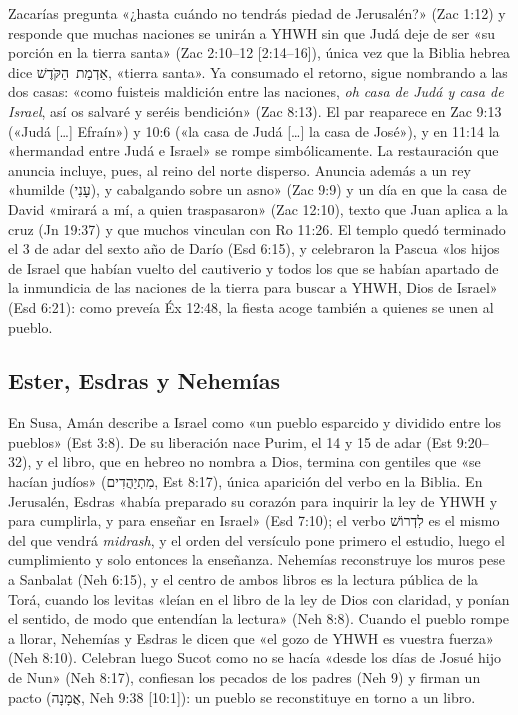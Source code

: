 \documentclass[11pt,letterpaper]{article}
\newcommand{\heb}[1]{\mbox{\foreignlanguage{hebrew}{#1}}}
\begin{document}
Zacarías pregunta «¿hasta cuándo no tendrás piedad de Jerusalén?» (Zac 1:12) y responde que muchas naciones se unirán a YHWH sin que Judá deje de ser «su porción en la tierra santa» (Zac 2:10--12 [2:14--16]), única vez que la Biblia hebrea dice \heb{אַדְמַת הַקֹּדֶשׁ}, «tierra santa». Ya consumado el retorno, sigue nombrando a las dos casas: «como fuisteis maldición entre las naciones, \emph{oh casa de Judá y casa de Israel}, así os salvaré y seréis bendición» (Zac 8:13). El par reaparece en Zac 9:13 («Judá [\ldots] Efraín») y 10:6 («la casa de Judá [\ldots] la casa de José»), y en 11:14 la «hermandad entre Judá e Israel» se rompe simbólicamente. La restauración que anuncia incluye, pues, al reino del norte disperso. Anuncia además a un rey «humilde (\heb{עָנִי}), y cabalgando sobre un asno» (Zac 9:9) y un día en que la casa de David «mirará a mí, a quien traspasaron» (Zac 12:10), texto que Juan aplica a la cruz (Jn 19:37) y que muchos vinculan con Ro 11:26. El templo quedó terminado el 3 de adar del sexto año de Darío (Esd 6:15), y celebraron la Pascua «los hijos de Israel que habían vuelto del cautiverio y todos los que se habían apartado de la inmundicia de las naciones de la tierra para buscar a YHWH, Dios de Israel» (Esd 6:21): como preveía Éx 12:48, la fiesta acoge también a quienes se unen al pueblo.

\subsection{Ester, Esdras y Nehemías}
En Susa, Amán describe a Israel como «un pueblo esparcido y dividido entre los pueblos» (Est 3:8). De su liberación nace Purim, el 14 y 15 de adar (Est 9:20--32), y el libro, que en hebreo no nombra a Dios, termina con gentiles que «se hacían judíos» (\heb{מִתְיַהֲדִים}, Est 8:17), única aparición del verbo en la Biblia. En Jerusalén, Esdras «había preparado su corazón para inquirir la ley de YHWH y para cumplirla, y para enseñar en Israel» (Esd 7:10); el verbo \heb{לִדְרוֹשׁ} es el mismo del que vendrá \emph{midrash}, y el orden del versículo pone primero el estudio, luego el cumplimiento y solo entonces la enseñanza. Nehemías reconstruye los muros pese a Sanbalat (Neh 6:15), y el centro de ambos libros es la lectura pública de la Torá, cuando los levitas «leían en el libro de la ley de Dios con claridad, y ponían el sentido, de modo que entendían la lectura» (Neh 8:8). Cuando el pueblo rompe a llorar, Nehemías y Esdras le dicen que «el gozo de YHWH es vuestra fuerza» (Neh 8:10). Celebran luego Sucot como no se hacía «desde los días de Josué hijo de Nun» (Neh 8:17), confiesan los pecados de los padres (Neh 9) y firman un pacto (\heb{אֲמָנָה}, Neh 9:38 [10:1]): un pueblo se reconstituye en torno a un libro.
\end{document}
